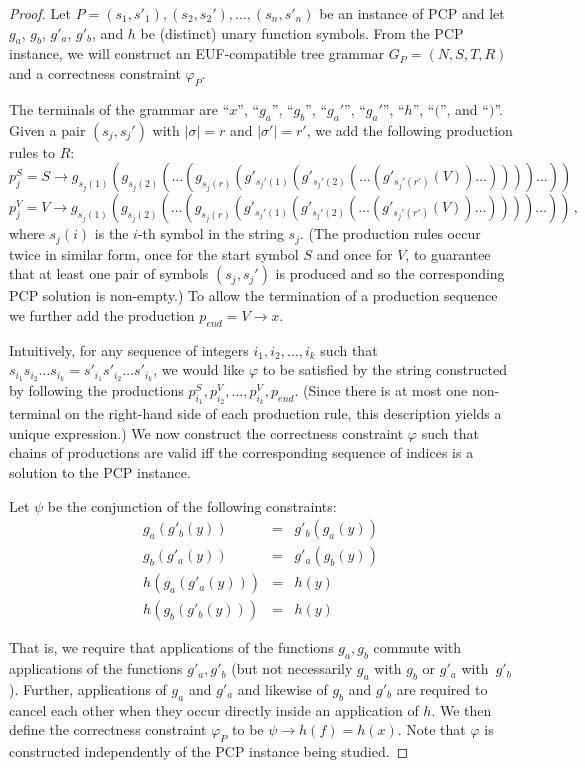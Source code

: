 \begin{proof}
Let $P = (s_1,s'_1), (s_2,s_2'),\dots,(s_n,s'_n)$ be an instance of PCP and let $g_a$, $g_b$, $g'_a$, $g'_b$, and $h$ be (distinct) unary function symbols. 
From the PCP instance, we will construct an EUF-compatible tree grammar $G_P=(N,S,T,R)$ and a correctness constraint $\varphi_P$. 



The terminals of the grammar are ``$x$'', ``$g_a$'', ``$g_b$'', ``$g_a'$'', ``$g_a'$'', ``$h$'', ``$($'', and ``$)$''.
Given a pair $(s_j, s_j')$ with $|\sigma|=r$ and $|\sigma'| = r'$, we add the following production rules to $R$:
\[p^S_j = S \rightarrow g_{s_j(1)}(g_{s_j(2)}(\dots(g_{s_j(r)}(g'_{s_j'(1)}(g'_{s_j'(2)}(\dots(g'_{s_j'(r')}(V))\dots))))\dots)) \ \]
\[p^V_j = V \rightarrow g_{s_j(1)}(g_{s_j(2)}(\dots(g_{s_j(r)}(g'_{s_j'(1)}(g'_{s_j'(2)}(\dots(g'_{s_j'(r')}(V))\dots))))\dots)) \,,\]
where $s_j(i)$ is the $i$-th symbol in the string $s_j$.
(The production rules occur twice in similar form, once for the start symbol $S$ and once for $V$, to guarantee that at least one pair of symbols $(s_j,s_j')$ is produced and so the corresponding PCP solution is non-empty.)
To allow the termination of a production sequence we further add the production $p_{end} = V \rightarrow x$.

Intuitively, for any sequence of integers $i_1,i_2,\dots,i_k$ such that $s_{i_1}s_{i_2}\dots s_{i_k} = s'_{i_1}s'_{i_2}\dots s'_{i_k}$, we would like $\varphi$ to be satisfied by the string constructed by following the productions $p^S_{i_1}, p^V_{i_2},\dots,p^V_{i_k},p_{end}$.
(Since there is at most one non-terminal on the right-hand side of each production rule, this description yields a unique expression.)
We now construct the correctness constraint $\varphi$ such that chains of productions are valid iff the corresponding sequence of indices is a solution to the PCP instance.

Let $\psi$ be the conjunction of the following constraints:
\[
\begin{array}{rcl}
g_{a}(g'_{b}(y)) &=& g'_{b}(g_{a}(y)) \\
g_{b}(g'_{a}(y)) &=& g'_{a}(g_{b}(y)) \\
h(g_a(g'_a(y))) &=& h(y) \\
h(g_b(g'_b(y))) &=& h(y)
\end{array}
\]

That is, we require that applications of the functions $g_a,g_b$ commute with applications of the functions $g'_a,g'_b$ (but not necessarily $g_a$ with $g_b$ or $g'_a$ with~$g'_b$). 
Further, applications of $g_a$ and $g'_a$ and likewise of $g_b$ and $g'_b$ are required to cancel each other when they occur directly inside an application of $h$. 
We then define the correctness constraint $\varphi_P$ to be $\psi \rightarrow h(f) = h(x)$. 
Note that $\varphi$ is constructed independently of the PCP instance being studied. 




\end{proof}
